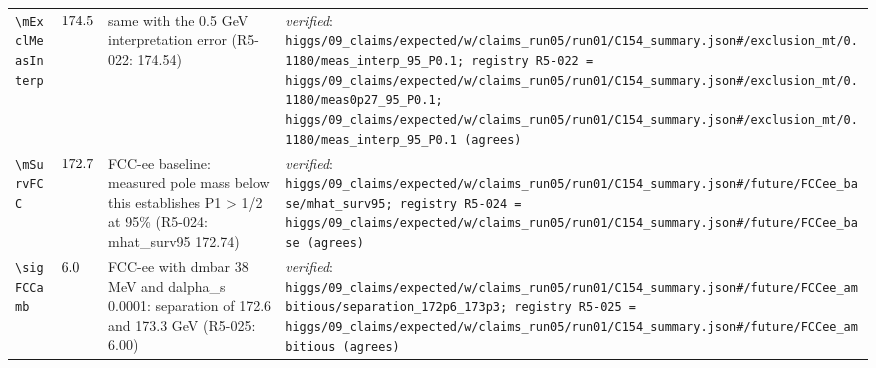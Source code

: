 {\begin{longtable}{@{}>{\raggedright\arraybackslash}p{}>{\raggedright\arraybackslash}p{}>{\raggedright\arraybackslash}p{}>{\raggedright\arraybackslash}p{}@{}}
\texttt{\textbackslash mExclMeasInterp} & $174.5$ & same with the 0.5 GeV interpretation error (R5-022: 174.54) & \emph{verified}: \texttt{higgs/\allowbreak{}09\_\allowbreak{}claims/\allowbreak{}expected/\allowbreak{}w/\allowbreak{}claims\_\allowbreak{}run05/\allowbreak{}run01/\allowbreak{}C154\_\allowbreak{}summary.json\#/\allowbreak{}exclusion\_\allowbreak{}mt/\allowbreak{}0.1180/\allowbreak{}meas\_\allowbreak{}interp\_\allowbreak{}95\_\allowbreak{}P0.1; registry R5-022 = higgs/\allowbreak{}09\_\allowbreak{}claims/\allowbreak{}expected/\allowbreak{}w/\allowbreak{}claims\_\allowbreak{}run05/\allowbreak{}run01/\allowbreak{}C154\_\allowbreak{}summary.json\#/\allowbreak{}exclusion\_\allowbreak{}mt/\allowbreak{}0.1180/\allowbreak{}meas0p27\_\allowbreak{}95\_\allowbreak{}P0.1; higgs/\allowbreak{}09\_\allowbreak{}claims/\allowbreak{}expected/\allowbreak{}w/\allowbreak{}claims\_\allowbreak{}run05/\allowbreak{}run01/\allowbreak{}C154\_\allowbreak{}summary.json\#/\allowbreak{}exclusion\_\allowbreak{}mt/\allowbreak{}0.1180/\allowbreak{}meas\_\allowbreak{}interp\_\allowbreak{}95\_\allowbreak{}P0.1 (agrees)} \\
\texttt{\textbackslash mSurvFCC} & $172.7$ & FCC-ee baseline: measured pole mass below this establishes P1 \textgreater{} 1/\allowbreak{}2 at 95\% (R5-024: mhat\_\allowbreak{}surv95 172.74) & \emph{verified}: \texttt{higgs/\allowbreak{}09\_\allowbreak{}claims/\allowbreak{}expected/\allowbreak{}w/\allowbreak{}claims\_\allowbreak{}run05/\allowbreak{}run01/\allowbreak{}C154\_\allowbreak{}summary.json\#/\allowbreak{}future/\allowbreak{}FCCee\_\allowbreak{}base/\allowbreak{}mhat\_\allowbreak{}surv95; registry R5-024 = higgs/\allowbreak{}09\_\allowbreak{}claims/\allowbreak{}expected/\allowbreak{}w/\allowbreak{}claims\_\allowbreak{}run05/\allowbreak{}run01/\allowbreak{}C154\_\allowbreak{}summary.json\#/\allowbreak{}future/\allowbreak{}FCCee\_\allowbreak{}base (agrees)} \\
\texttt{\textbackslash sigFCCamb} & $6.0$ & FCC-ee with dmbar 38 MeV and dalpha\_\allowbreak{}s 0.0001: separation of 172.6 and 173.3 GeV (R5-025: 6.00) & \emph{verified}: \texttt{higgs/\allowbreak{}09\_\allowbreak{}claims/\allowbreak{}expected/\allowbreak{}w/\allowbreak{}claims\_\allowbreak{}run05/\allowbreak{}run01/\allowbreak{}C154\_\allowbreak{}summary.json\#/\allowbreak{}future/\allowbreak{}FCCee\_\allowbreak{}ambitious/\allowbreak{}separation\_\allowbreak{}172p6\_\allowbreak{}173p3; registry R5-025 = higgs/\allowbreak{}09\_\allowbreak{}claims/\allowbreak{}expected/\allowbreak{}w/\allowbreak{}claims\_\allowbreak{}run05/\allowbreak{}run01/\allowbreak{}C154\_\allowbreak{}summary.json\#/\allowbreak{}future/\allowbreak{}FCCee\_\allowbreak{}ambitious (agrees)} \\

\end{longtable}}
